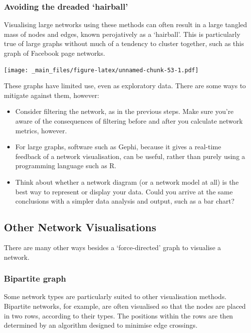 \documentclass[
]{book}
\begin{document}
\hypertarget{avoiding-the-dreaded-hairball}{%
\subsubsection{Avoiding the dreaded `hairball'}\label{avoiding-the-dreaded-hairball}}

Visualising large networks using these methods can often result in a large tangled mass of nodes and edges, known perojatively as a `hairball'. This is particularly true of large graphs without much of a tendency to cluster together, such as this graph of Facebook page networks\citep{musae}.

\texttt{[image: \_main\_files/figure-latex/unnamed-chunk-53-1.pdf]}

These graphs have limited use, even as exploratory data. There are some ways to mitigate against them, however:

\begin{itemize}
\item
  Consider filtering the network, as in the previous steps. Make sure you're aware of the consequences of filtering before and after you calculate network metrics, however.
\item
  For large graphs, software such as Gephi, because it gives a real-time feedback of a network visualisation, can be useful, rather than purely using a programming language such as R.
\item
  Think about whether a network diagram (or a network model at all) is the best way to represent or display your data. Could you arrive at the same conclusions with a simpler data analysis and output, such as a bar chart?
\end{itemize}

\hypertarget{other-network-visualisations}{%
\subsection{Other Network Visualisations}\label{other-network-visualisations}}

There are many other ways besides a `force-directed' graph to visualise a network.

\hypertarget{bipartite-graph}{%
\subsubsection{Bipartite graph}\label{bipartite-graph}}

Some network types are particularly suited to other visualisation methods. Bipartite networks, for example, are often visualised so that the nodes are placed in two rows, according to their types. The positions within the rows are then determined by an algorithm designed to minimise edge crossings.
\end{document}
